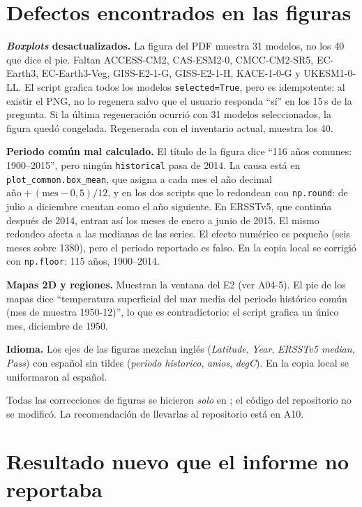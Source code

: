 \section{Defectos encontrados en las figuras}

\textbf{\emph{Boxplots} desactualizados.} La figura del PDF muestra 31 modelos, no los 40 que dice el pie. Faltan ACCESS-CM2, CAS-ESM2-0, CMCC-CM2-SR5, EC-Earth3, EC-Earth3-Veg, GISS-E2-1-G, GISS-E2-1-H, KACE-1-0-G y UKESM1-0-LL. El script grafica todos los modelos \texttt{selected=True}, pero es idempotente: al existir el PNG, no lo regenera salvo que el usuario responda ``sí'' en los 15\,s de la pregunta. Si la última regeneración ocurrió con 31 modelos seleccionados, la figura quedó congelada. Regenerada con el inventario actual, muestra los 40.

\textbf{Periodo común mal calculado.} El título de la figura dice ``116 años comunes: 1900--2015'', pero ningún \texttt{historical} pasa de 2014. La causa está en \texttt{plot\_common.box\_mean}, que asigna a cada mes el año decimal $\text{año}+(\text{mes}-0{,}5)/12$, y en los dos scripts que lo redondean con \texttt{np.round}: de julio a diciembre cuentan como el año siguiente. En ERSSTv5, que continúa después de 2014, entran así los meses de enero a junio de 2015. El mismo redondeo afecta a las medianas de las series. El efecto numérico es pequeño (seis meses sobre 1380), pero el periodo reportado es falso. En la copia local se corrigió con \texttt{np.floor}: 115 años, 1900--2014.

\textbf{Mapas 2D y regiones.} Muestran la ventana del E2 (ver A04-5). El pie de los mapas dice ``temperatura superficial del mar media del periodo histórico común (mes de muestra 1950-12)'', lo que es contradictorio: el script grafica un único mes, diciembre de 1950.

\textbf{Idioma.} Los ejes de las figuras mezclan inglés (\emph{Latitude}, \emph{Year}, \emph{ERSSTv5 median}, \emph{Pass}) con español sin tildes (\emph{periodo historico}, \emph{anios}, \emph{degC}). En la copia local se uniformaron al español.

Todas las correcciones de figuras se hicieron \emph{solo} en ; el código del repositorio no se modificó. La recomendación de llevarlas al repositorio está en A10.

\section{Resultado nuevo que el informe no reportaba}

